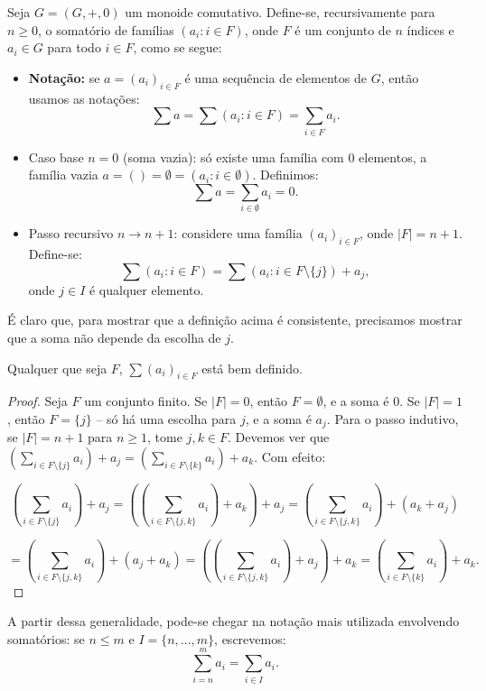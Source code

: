 \begin{definition}\label{def:group_sum}
Seja $G=(G, +, 0)$ um monoide comutativo.
Define-se, recursivamente para $n\geq 0$, o somatório de famílias $(a_i: i \in F)$, onde $F$ é um conjunto de $n$ índices e $a_i \in G$ para todo $i \in F$, como se segue:

\begin{itemize}
    \item \textbf{Notação:} se $a=(a_i)_{i\in F}$ é uma sequência de elementos de $G$, então usamos as notações:
    \[\sum a=\sum(a_i: i\in F)=\sum_{i\in F} a_i.\]
    \item Caso base $n=0$ (soma vazia): só existe uma família com $0$ elementos, a família vazia $a=()=\emptyset=(a_i:i\in \emptyset)$.
    Definimos: \[\sum a=\sum_{i \in \emptyset}a_i=0.\]
    \item Passo recursivo $n\rightarrow n+1$: considere uma família $(a_i)_{i\in F}$, onde $|F|=n+1$.
    Define-se:
    \[\sum(a_i: i \in F)=\sum(a_i: i \in F\setminus\{j\})+a_j,\]
    onde $j \in I$ é qualquer elemento.
\end{itemize}
\end{definition}
É claro que, para mostrar que a definição acima é consistente, precisamos mostrar que a soma não depende da escolha de $j$.

\begin{lemma}
Qualquer que seja $F$, $\sum(a_i)_{i\in F}$ está bem definido.
\end{lemma}

\begin{proof}
    Seja $F$ um conjunto finito.
Se $|F|=0$, então $F=\emptyset$, e a soma é $0$.
Se $|F|=1$, então $F=\{j\}$ -- só há uma escolha para $j$, e a soma é $a_j$.
    Para o passo indutivo, se $|F|=n+1$ para $n\geq 1$, tome $j, k \in F$.
    Devemos ver que $\left(\sum_{i\in F\setminus\{j\}} a_i\right)+a_j=\left(\sum_{i\in F\setminus\{k\}} a_i\right)+a_k$.
    Com efeito:

    \[\left(\sum_{i\in F\setminus\{j\}} a_i\right)+a_j=\left(\left(\sum_{i\in F\setminus\{j, k\}} a_i\right)+a_k\right)+a_j=\left(\sum_{i\in F\setminus\{j, k\}} a_i\right)+(a_k+a_j)\]

    \[=\left(\sum_{i\in F\setminus\{j, k\}} a_i\right)+(a_j+a_k)=\left(\left(\sum_{i\in F\setminus\{j, k\}} a_i\right)+a_j\right)+a_k=\left(\sum_{i\in F\setminus\{k\}} a_i\right)+a_k.\]
\end{proof}

A partir dessa generalidade, pode-se chegar na notação mais utilizada envolvendo somatórios: se $n\leq m$ e $I=\{n, \dots, m\}$, escrevemos:
\[\sum_{i=n}^m a_i=\sum_{i\in I} a_i.\]


